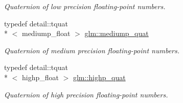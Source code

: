 \begin{DoxyCompactItemize}
\begin{DoxyCompactList}\small\item\em Quaternion of low precision floating-\/point numbers. \end{DoxyCompactList}\item 
typedef detail\-::tquat\\*
$<$ mediump\-\_\-float $>$ \hyperlink{group__gtc__quaternion_gaf4523725b36d8d422f44ea28fd37d407}{glm\-::mediump\-\_\-quat}
\begin{DoxyCompactList}\small\item\em Quaternion of medium precision floating-\/point numbers. \end{DoxyCompactList}\item 
typedef detail\-::tquat\\*
$<$ highp\-\_\-float $>$ \hyperlink{group__gtc__quaternion_ga86a81668075e0896b7d6cd395d1d01ec}{glm\-::highp\-\_\-quat}
\begin{DoxyCompactList}\small\item\em Quaternion of high precision floating-\/point numbers. \end{DoxyCompactList}\end{DoxyCompactItemize}
